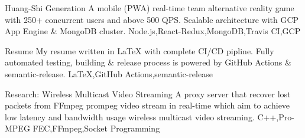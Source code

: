 \begin{projects}
  \project
  {Huang-Shi Generation}{}
  {}
  {A mobile (PWA) real-time team alternative reality game with 250+ concurrent users and above 500 QPS. Scalable architecture with GCP App Engine \& MongoDB cluster.}
  {Node.js,React-Redux,MongoDB,Travis CI,GCP}

  \project
  {Resume}{}
  {}
  {My resume written in LaTeX with complete CI/CD pipline. Fully automated testing, building \& release process is powered by GitHub Actions \& semantic-release.}
  {LaTeX,GitHub Actions,semantic-release}

  \project
  {Research: Wireless Multicast Video Streaming}{}
  {}
  {A proxy server that recover lost packets from FFmpeg prompeg video stream in real-time which aim to achieve low latency and bandwidth usage wireless multicast video streaming.}
  {C++,Pro-MPEG FEC,FFmpeg,Socket Programming}

\end{projects}
